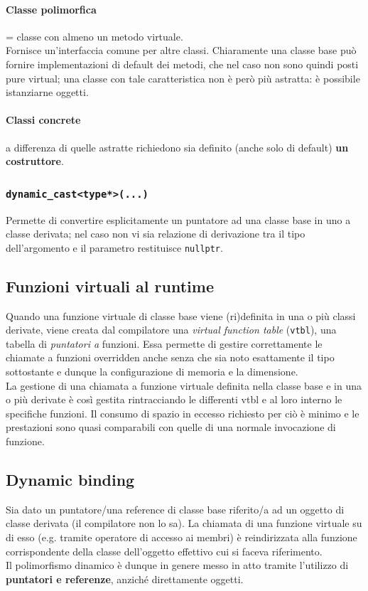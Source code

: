 \documentclass[10pt, oneside]{book}
\begin{document}
\paragraph{Classe polimorfica} = classe con almeno un metodo virtuale.\\
Fornisce un'interfaccia comune per altre classi. Chiaramente una classe base può fornire implementazioni di default dei metodi, che nel caso non sono quindi posti pure virtual; una classe con tale caratteristica non è però più astratta: è possibile istanziarne oggetti.

\paragraph{Classi concrete} a differenza di quelle astratte richiedono sia definito (anche solo di default) \textbf{un costruttore}.

\subsubsection{\texttt{dynamic\_cast<type*>(...)}}
Permette di convertire esplicitamente un puntatore ad una classe base in uno a classe derivata; nel caso non vi sia relazione di derivazione tra il tipo dell'argomento e il parametro restituisce \texttt{nullptr}.

\subsection{Funzioni virtuali al runtime}
Quando una funzione virtuale di classe base viene (ri)definita in una o più classi derivate, viene creata dal compilatore una \textit{virtual function table} (\texttt{vtbl}), una tabella di \textit{puntatori a} funzioni. Essa permette di gestire correttamente le chiamate a funzioni overridden anche senza che sia noto esattamente il tipo sottostante e dunque la configurazione di memoria e la dimensione.\\
La gestione di una chiamata a funzione virtuale definita nella classe base e in una o più derivate è così gestita rintracciando le differenti vtbl e al loro interno le specifiche funzioni. Il consumo di spazio in eccesso richiesto per ciò è minimo e le prestazioni sono quasi comparabili con quelle di una normale invocazione di funzione.

\subsection{Dynamic binding}
Sia dato un puntatore/una reference di classe base riferito/a ad un oggetto di classe derivata (il compilatore non lo sa). La chiamata di una funzione virtuale su di esso (e.g. tramite operatore di accesso ai membri) è reindirizzata alla funzione corrispondente della classe dell'oggetto effettivo cui si faceva riferimento.\\
Il polimorfismo dinamico è dunque in genere messo in atto tramite l'utilizzo di \textbf{puntatori e referenze}, anziché direttamente oggetti.
\end{document}
